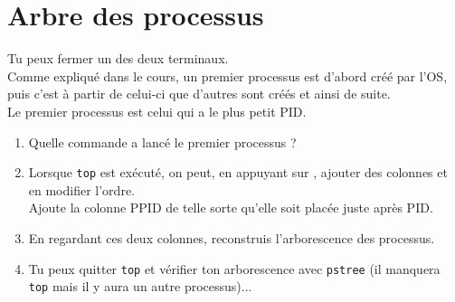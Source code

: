 \documentclass[a4paper,12pt,french]{book}
\begin{document}
\section*{Arbre des processus}
Tu peux fermer un des deux terminaux.\\

Comme expliqué dans le cours, un premier processus est d'abord créé par l'OS, puis c'est à partir de celui-ci que d'autres sont créés et ainsi de suite.\\
Le premier processus est celui qui a le plus petit PID.\\
\begin{enumerate}
	\item 	Quelle commande a lancé le premier processus ?
	\item 	Lorsque \texttt{top} est exécuté, on peut, en appuyant sur  , ajouter des colonnes et en modifier l'ordre.\\
            Ajoute la colonne PPID de telle sorte qu'elle soit placée juste après PID.
     \item 	En regardant ces deux colonnes, reconstruis l'arborescence des processus.
     \item 	Tu peux quitter \texttt{top} et vérifier ton arborescence avec \texttt{pstree} (il manquera \texttt{top} mais il y aura un autre processus)...
     \end{enumerate}

\newpage
\end{document}
